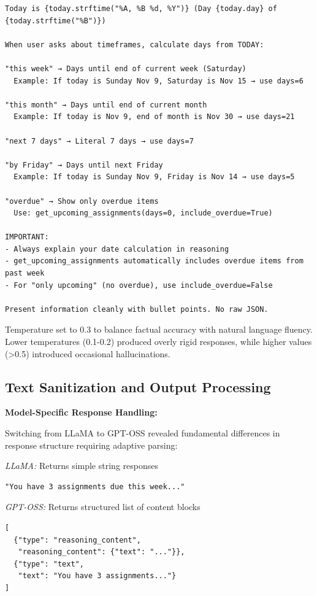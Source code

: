 \documentclass{article}
\begin{document}
\begin{verbatim}
Today is {today.strftime("%A, %B %d, %Y")} (Day {today.day} of {today.strftime("%B")})

When user asks about timeframes, calculate days from TODAY:

"this week" → Days until end of current week (Saturday)
  Example: If today is Sunday Nov 9, Saturday is Nov 15 → use days=6

"this month" → Days until end of current month
  Example: If today is Nov 9, end of month is Nov 30 → use days=21
  
"next 7 days" → Literal 7 days → use days=7

"by Friday" → Days until next Friday
  Example: If today is Sunday Nov 9, Friday is Nov 14 → use days=5

"overdue" → Show only overdue items
  Use: get_upcoming_assignments(days=0, include_overdue=True)

IMPORTANT: 
- Always explain your date calculation in reasoning
- get_upcoming_assignments automatically includes overdue items from past week
- For "only upcoming" (no overdue), use include_overdue=False

Present information cleanly with bullet points. No raw JSON.
\end{verbatim}

Temperature set to 0.3 to balance factual accuracy with natural language fluency. Lower temperatures (0.1-0.2) produced overly rigid responses, while higher values (>0.5) introduced occasional hallucinations.

\subsection{Text Sanitization and Output Processing}

\textbf{Model-Specific Response Handling:}

Switching from LLaMA to GPT-OSS revealed fundamental differences in response structure requiring adaptive parsing:

\textit{LLaMA:} Returns simple string responses
\begin{verbatim}
"You have 3 assignments due this week..."
\end{verbatim}

\textit{GPT-OSS:} Returns structured list of content blocks
\begin{verbatim}
[
  {"type": "reasoning_content", 
   "reasoning_content": {"text": "..."}},
  {"type": "text", 
   "text": "You have 3 assignments..."}
]
\end{verbatim}
\end{document}
